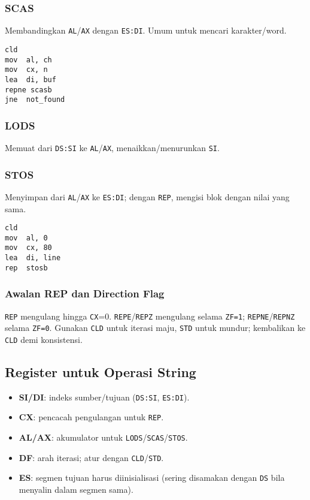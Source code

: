\documentclass[../main.tex]{subfiles}
\begin{document}
\subsubsection{SCAS}
Membandingkan \texttt{AL}/\texttt{AX} dengan \texttt{ES:DI}. Umum untuk mencari karakter/word.
\begin{verbatim}
cld
mov  al, ch
mov  cx, n
lea  di, buf
repne scasb
jne  not_found
\end{verbatim}

\subsubsection{LODS}
Memuat dari \texttt{DS:SI} ke \texttt{AL}/\texttt{AX}, menaikkan/menurunkan \texttt{SI}.

\subsubsection{STOS}
Menyimpan dari \texttt{AL}/\texttt{AX} ke \texttt{ES:DI}; dengan \texttt{REP}, mengisi blok dengan nilai yang sama.
\begin{verbatim}
cld
mov  al, 0
mov  cx, 80
lea  di, line
rep  stosb
\end{verbatim}

\subsubsection{Awalan REP dan Direction Flag}
\texttt{REP} mengulang hingga \texttt{CX}=0. \texttt{REPE}/\texttt{REPZ} mengulang selama \texttt{ZF=1}; \texttt{REPNE}/\texttt{REPNZ} selama \texttt{ZF=0}. Gunakan \texttt{CLD} untuk iterasi maju, \texttt{STD} untuk mundur; kembalikan ke \texttt{CLD} demi konsistensi.

\subsection{Register untuk Operasi String}
\begin{itemize}
  \item \textbf{SI/DI}: indeks sumber/tujuan (\texttt{DS:SI}, \texttt{ES:DI}).
  \item \textbf{CX}: pencacah pengulangan untuk \texttt{REP}.
  \item \textbf{AL/AX}: akumulator untuk \texttt{LODS}/\texttt{SCAS}/\texttt{STOS}.
  \item \textbf{DF}: arah iterasi; atur dengan \texttt{CLD}/\texttt{STD}.
  \item \textbf{ES}: segmen tujuan harus diinisialisasi (sering disamakan dengan \texttt{DS} bila menyalin dalam segmen sama).
\end{itemize}
\end{document}
